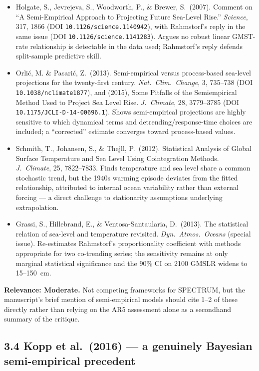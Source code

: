 \documentclass[11pt]{article}
\begin{document}
\begin{itemize}[leftmargin=*]
\item Holgate, S., Jevrejeva, S., Woodworth, P., \& Brewer, S.\ (2007).
Comment on ``A Semi-Empirical Approach to Projecting Future Sea-Level
Rise.'' \textit{Science}, 317, 1866 (DOI \texttt{10.1126/science.1140942}),
with Rahmstorf's reply in the same issue (DOI
\texttt{10.1126/science.1141283}). Argues no robust linear GMST-rate
relationship is detectable in the data used; Rahmstorf's reply defends
split-sample predictive skill.
\item Orlić, M. \& Pasarić, Z.\ (2013). Semi-empirical versus
process-based sea-level projections for the twenty-first century.
\textit{Nat.\ Clim.\ Change}, 3, 735--738 (DOI \texttt{10.1038/nclimate1877}),
and (2015), Some Pitfalls of the Semiempirical Method Used to Project Sea
Level Rise. \textit{J.\ Climate}, 28, 3779--3785 (DOI
\texttt{10.1175/JCLI-D-14-00696.1}). Shows semi-empirical projections are
highly sensitive to which dynamical terms and detrending/response-time
choices are included; a ``corrected'' estimate converges toward
process-based values.
\item Schmith, T., Johansen, S., \& Thejll, P.\ (2012). Statistical
Analysis of Global Surface Temperature and Sea Level Using Cointegration
Methods. \textit{J.\ Climate}, 25, 7822--7833. Finds temperature and sea
level share a common stochastic trend, but the 1940s warming episode
deviates from the fitted relationship, attributed to internal ocean
variability rather than external forcing --- a direct challenge to
stationarity assumptions underlying extrapolation.
\item Grassi, S., Hillebrand, E., \& Ventosa-Santaularia, D.\ (2013). The
statistical relation of sea-level and temperature revisited. \textit{Dyn.\
Atmos.\ Oceans} (special issue). Re-estimates Rahmstorf's proportionality
coefficient with methods appropriate for two co-trending series; the
sensitivity remains at only marginal statistical significance and the 90\%
CI on 2100 GMSLR widens to 15--150~cm.
\end{itemize}

\noindent\textbf{Relevance: Moderate.} Not competing frameworks for
SPECTRUM, but the manuscript's brief mention of semi-empirical models should
cite 1--2 of these directly rather than relying on the AR5 assessment alone
as a secondhand summary of the critique.

\subsection*{3.4 Kopp et al.\ (2016) --- a genuinely Bayesian semi-empirical precedent}
\end{document}
